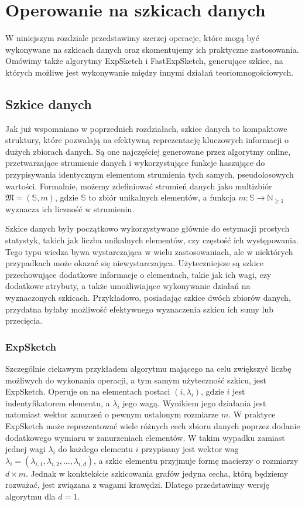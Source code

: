 \chapter{Operowanie na szkicach danych}
    W niniejszym rozdziale przedstawimy szerzej operacje, które mogą być wykonywane na szkicach danych oraz skomentujemy ich praktyczne zastosowania. Omówimy także algorytmy ExpSketch i FastExpSketch, generujące szkice, na których możliwe jest wykonywanie między innymi działań teoriomnogościowych.

\section{Szkice danych}
    Jak już wspomniano w poprzednich rozdziałach, szkice danych to kompaktowe struktury, które pozwalają na efektywną reprezentację kluczowych informacji o dużych zbiorach danych. Są one najczęściej generowane przez algorytmy online, przetwarzające strumienie danych i wykorzystujące funkcje haszujące do przypisywania identycznym elementom strumienia tych samych, pseudolosowych wartości. Formalnie, możemy zdefiniować strumień danych jako multizbiór $\mathfrak{M} = (\mathbb{S},m)$, gdzie $\mathbb{S}$ to zbiór unikalnych elementów, a funkcja $m : \mathbb{S} \rightarrow \mathbb{N}_{\geq 1}$ wyznacza ich liczność w strumieniu.

    Szkice danych były początkowo wykorzystywane głównie do estymacji prostych statystyk, takich jak liczba unikalnych elementów, czy częstość ich występowania. Tego typu wiedza bywa wystarczająca w wielu zastosowaniach, ale w niektórych przypadkach może okazać się niewystarczająca. Użyteczniejsze są szkice przechowujące dodatkowe informacje o elementach, takie jak ich wagi, czy dodatkowe atrybuty, a także umożliwiające wykonywanie działań na wyznaczonych szkicach. Przykładowo, posiadając szkice dwóch zbiorów danych, przydatna byłaby możliwość efektywnego wyznaczenia szkicu ich sumy lub przecięcia.  

\subsection{ExpSketch}
    Szczególnie ciekawym przykładem algorytmu mającego na celu zwiększyć liczbę możliwych do wykonania operacji, a tym samym użyteczność szkicu, jest ExpSketch\cite{Lemiesz_2021}. Operuje on na elementach postaci $(i, \lambda_{i})$, gdzie $i$ jest indentyfikatorem elementu, a $\lambda_{i}$ jego wagą. Wynikiem jego działania jest natomiast wektor zanurzeń o pewnym ustalonym rozmiarze $m$. W praktyce ExpSketch może reprezentować wiele różnych cech zbioru danych poprzez dodanie dodatkowego wymiaru w zanurzeniach elementów. W takim wypadku zamiast jednej wagi $\lambda_i$ do każdego elementu $i$ przypisany jest wektor wag $\lambda_i = (\lambda_{i,1}, \lambda_{i,2}, \dots, \lambda_{i,d})$, a szkic elementu przyjmuje formę macierzy o rozmiarzy $d \times m$. Jednak w konktekście szkicowania grafów jedyna cecha, którą będziemy rozważać, jest związana z wagami krawędzi. Dlatego przedstawimy wersję algorytmu dla $d = 1$.

